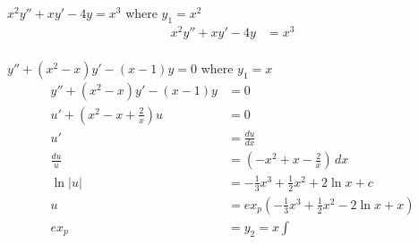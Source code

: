 \begin{ex}
$x^2y''+xy'-4y=x^3$ where $y_1=x^2$
\begin{align*}
    x^2y''+xy'-4y&=x^3\\
\end{align*}
\end{ex}
\begin{ex}
$y''+(x^2-x)y'-(x-1)y=0$ where $y_1=x$
\begin{align*}
    y''+(x^2-x)y'-(x-1)y&=0\\
    u'+(x^2-x+\frac{2}{x})u&=0\\
    u'&=\frac{du}{dx}\\
    \frac{du}{u}&=\left( -x^2+x-\frac{2}{x} \right) \,dx\\
    \ln |u| &= -\frac{1}{3}x^3+\frac{1}{2}x^2+2 \ln x +c\\
    u&= ex_p (-\frac{1}{3}x^3+\frac{1}{2}x^2-2 \ln x +x)\\
    ex_p&= y_2=x\int
\end{align*}
\end{ex}